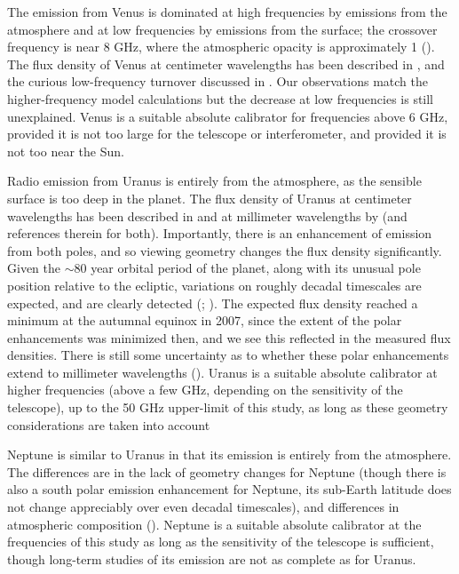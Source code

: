 \documentclass{aastex}
\begin{document}
The emission from Venus is dominated at high frequencies by emissions
from the atmosphere and at low frequencies by emissions from the
surface; the crossover frequency is near 8 GHz, where the atmospheric
opacity is approximately 1 (\citet{Muh79}).  The flux density of Venus
at centimeter wavelengths has been described in \citet{But01}, and the
curious low-frequency turnover discussed in \citet{But04}.  Our
observations match the higher-frequency model calculations but the
decrease at low frequencies is still unexplained. Venus is a suitable
absolute calibrator for frequencies above 6 GHz, provided it is not
too large for the telescope or interferometer, and provided it is
not too near the Sun.

Radio emission from Uranus is entirely from the atmosphere, as the
sensible surface is too deep in the planet.  The flux
density of Uranus at centimeter wavelengths has been described in
\citet{Hof03} and at millimeter wavelengths by \citet{Gri93} (and
references therein for both).  Importantly, there is an enhancement of
emission from both poles, and so viewing geometry changes the flux
density significantly.  Given the $\sim$80 year orbital period of the
planet, along with its unusual pole position relative to the ecliptic,
variations on roughly decadal timescales are expected, and are clearly
detected (\citet{Hof03}; \citet{Kle06}).  The expected flux density
reached a minimum at the autumnal equinox in 2007, since the extent of
the polar enhancements was minimized then, and we see this reflected in
the measured flux densities.  There is still some uncertainty as to
whether these polar enhancements extend to millimeter wavelengths
(\citet{Hof07}).  Uranus is a suitable absolute calibrator at
higher frequencies (above a few GHz, depending on the sensitivity of
the telescope), up to the 50 GHz upper-limit of this study, as long as
these geometry considerations are taken into account

Neptune is similar to Uranus in that its emission is entirely from the
atmosphere.  The differences are in the lack of geometry changes for
Neptune (though there is also a south polar emission enhancement for
Neptune, its sub-Earth latitude does not change appreciably over even
decadal timescales), and differences in atmospheric composition
(\citet{DeB96}).  Neptune is a suitable absolute calibrator
at the frequencies of this study as long as the sensitivity of the
telescope is sufficient, though long-term studies of its emission are
not as complete as for Uranus.
\end{document}
